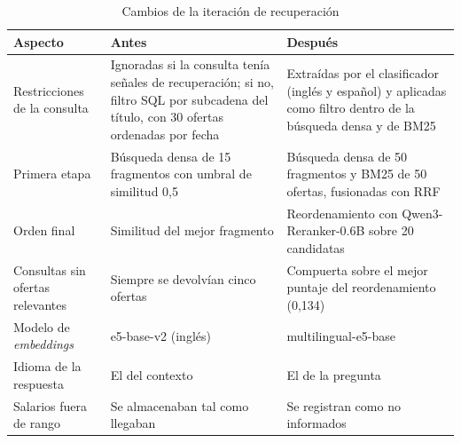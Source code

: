 \begin{table}[htbp!]
    \centering
    \caption{Cambios de la iteración de recuperación}
    \label{tab:art-cambios}
    \small
    \begin{tabular}{|p{3cm}|p{5.4cm}|p{5.4cm}|}
        \hline
        \textbf{Aspecto} & \textbf{Antes} & \textbf{Después} \\
        \hline
        Restricciones de la consulta & Ignoradas si la consulta tenía señales de recuperación; si no, filtro SQL por subcadena del título, con 30 ofertas ordenadas por fecha & Extraídas por el clasificador (inglés y español) y aplicadas como filtro dentro de la búsqueda densa y de BM25 \\
        \hline
        Primera etapa & Búsqueda densa de 15 fragmentos con umbral de similitud 0,5 & Búsqueda densa de 50 fragmentos y BM25 de 50 ofertas, fusionadas con RRF \\
        \hline
        Orden final & Similitud del mejor fragmento & Reordenamiento con Qwen3-Reranker-0.6B sobre 20 candidatas \\
        \hline
        Consultas sin ofertas relevantes & Siempre se devolvían cinco ofertas & Compuerta sobre el mejor puntaje del reordenamiento (0,134) \\
        \hline
        Modelo de \textit{embeddings} & e5-base-v2 (inglés) & multilingual-e5-base \\
        \hline
        Idioma de la respuesta & El del contexto & El de la pregunta \\
        \hline
        Salarios fuera de rango & Se almacenaban tal como llegaban & Se registran como no informados \\
        \hline
    \end{tabular}
\end{table}

